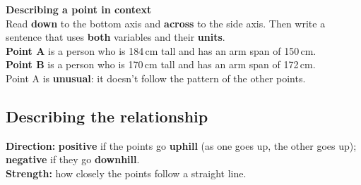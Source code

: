 \documentclass[12pt,a4paper]{article}
\begin{document}
\begin{minipage}[t]{0.46\linewidth}\vspace{0pt}
\textbf{Describing a point in context}\\[2pt]
Read \textbf{down} to the bottom axis and \textbf{across} to the side axis. Then write a sentence that uses
\textbf{both} variables and their \textbf{units}.\\[6pt]
\textbf{Point A} is a person who is 184\,cm tall and has an arm span of 150\,cm.\\[6pt]
\textbf{Point B} is a person who is 170\,cm tall and has an arm span of 172\,cm.\\[6pt]
Point A is \textbf{unusual}: it doesn't follow the pattern of the other points.
\end{minipage}

\vspace{9mm}
\subsection*{Describing the relationship}
\textbf{Direction:} \textbf{positive} if the points go \textbf{uphill} (as one goes up, the other goes up);
\textbf{negative} if they go \textbf{downhill}.\\
\textbf{Strength:} how closely the points follow a straight line.
\end{document}

